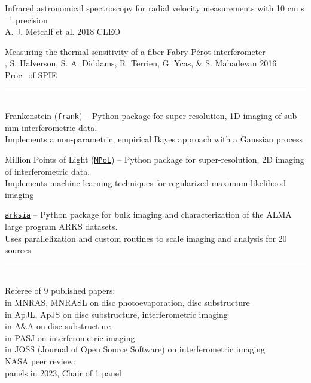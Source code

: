 \documentclass[10pt,preprint]{aastex}
\newcommand*{\xdash}[1][3em]{\rule[0.5ex]{#1}{0.7pt}}
\begin{document}
\noindent Infrared astronomical spectroscopy for radial velocity
measurements with 10 cm s$^{-1}$ precision \\
\indent A. J. Metcalf et al. 2018 CLEO

\noindent Measuring the thermal sensitivity of a fiber Fabry-P{\'e}rot interferometer \\
, S. Halverson, S. A. Diddams, R. Terrien, G. Ycas, \& S. Mahadevan 2016 Proc.~of SPIE

 \xdash[98.5ex] \\
\noindent Frankenstein (\href{https://discsim.github.io/frank/}{\tt frank}) -- Python package for super-resolution, 1D imaging of sub-mm interferometric data. \\ \-\hspace{3.65cm}Implements a non-parametric, empirical Bayes approach with a Gaussian process

\noindent Million Points of Light (\href{https://mpol-dev.github.io/MPoL/index.html}{\tt MPoL}) -- Python package for super-resolution, 2D imaging of interferometric data. \\ \-\hspace{3.65cm}Implements machine learning techniques for regularized maximum likelihood imaging

\noindent \href{https://github.com/jeffjennings/arksia/}{\tt arksia} -- Python package for bulk imaging and characterization of the ALMA large program ARKS datasets. \\ \-\hspace{3.65cm}Uses parallelization and custom routines to scale imaging and analysis for 20 sources

 \xdash[95ex] \\
\noindent Referee of 9 published papers: \\
 in MNRAS, MNRASL on disc photoevaporation, disc substructure \\
 in ApJL, ApJS on disc substructure, interferometric imaging \\
 in A\&A on disc substructure \\
 in PASJ on interferometric imaging \\
 in JOSS (Journal of Open Source Software) on interferometric imaging \\
\noindent NASA peer review: \\
 panels in 2023, Chair of 1 panel
\end{document}
